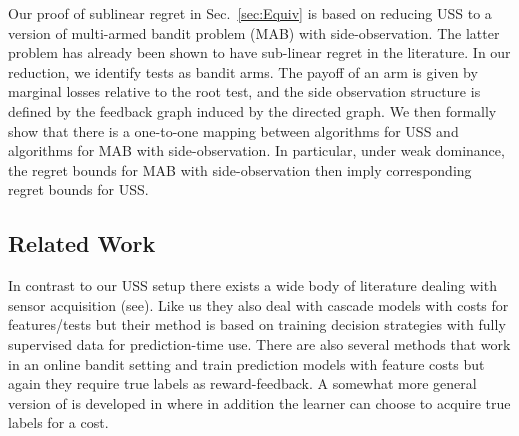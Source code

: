Our proof of sublinear regret in Sec.~\ref{sec:Equiv} is based on reducing USS to a version of multi-armed bandit problem (MAB) with side-observation. The latter problem has already been shown to have sub-linear regret in the literature. In our reduction, we identify tests as bandit arms. %
The payoff of an arm is given by marginal losses relative to the root test, and the side observation structure is defined by the feedback graph induced by the directed graph. We then formally show that there is a one-to-one mapping between algorithms for USS and algorithms for MAB with side-observation. In particular, under weak dominance, the regret bounds for MAB with side-observation then imply corresponding regret bounds for USS.

\subsection{Related Work}
%
%
In contrast to our USS setup there exists a wide body of literature dealing with sensor acquisition (see\cite{AISTATS13_SupervisedSequentialLearning_TrapezSaligram}). Like us they also deal with cascade models with costs for features/tests but their method is based on training decision strategies with fully supervised data for prediction-time use. There are also several methods that work in an online bandit setting and train prediction models with feature costs \cite{SBCA14:BanditsPaid} but again they require true labels as reward-feedback. A somewhat more general version of \cite{SBCA14:BanditsPaid} is developed in \cite{ZBGGySz13:CostlyFeatures} where in addition the learner can choose to acquire true labels for a cost.

%

